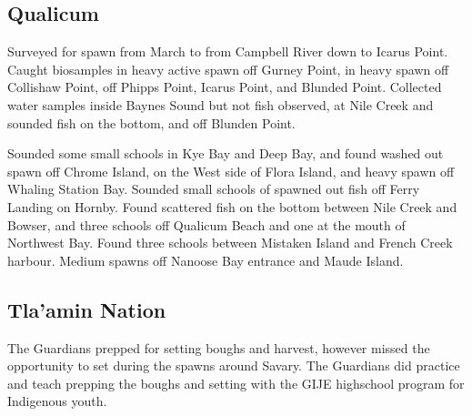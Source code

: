 \subsection{Qualicum}

Surveyed for spawn from March  to  from Campbell River down to Icarus Point.
Caught biosamples in heavy active spawn off Gurney Point,
in heavy spawn off Collishaw Point, off Phipps Point, Icarus Point, and Blunded Point.
Collected water samples inside Baynes Sound but not fish observed,
at Nile Creek and sounded fish on the bottom, and
off Blunden Point.

Sounded some small schools in Kye Bay and Deep Bay,
and found washed out spawn off Chrome Island,
on the West side of Flora Island, and
heavy spawn off Whaling Station Bay.
Sounded small schools of spawned out fish off Ferry Landing on Hornby.
Found scattered fish on the bottom between Nile Creek and Bowser,
and three schools off Qualicum Beach and one at the mouth of Northwest Bay.
Found three schools between Mistaken Island and French Creek harbour.
Medium spawns off Nanoose Bay entrance and Maude Island.

\subsection{Tla'amin Nation}

The Guardians prepped for setting boughs and harvest,
however missed the opportunity to set during the spawns around Savary. 
The Guardians did practice and teach prepping the boughs and setting
with the GIJE highschool program for Indigenous youth.
